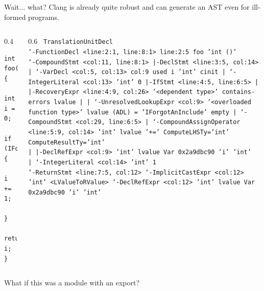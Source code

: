 \documentclass[aspectratio=169]{beamer}
\begin{document}
\begin{frame}[fragile]{Wait... what?}
  Clang is already quite robust and can generate an AST even for ill-formed programs.
  \vspace{1em}
  \begin{columns}
    \begin{column}{0.4\textwidth}
      \begin{verbatim}
int foo() {
    int i = 0;
    if (IForgotAnInclude()) {
        i += 1;
    }
    return i;
}
    \end{verbatim}
    \end{column}
    \begin{column}{0.6\textwidth}
      \tiny\texttt{
      TranslationUnitDecl \\
      `-FunctionDecl <line:2:1, line:8:1> line:2:5 foo 'int ()' \\
      `-CompoundStmt <col:11, line:8:1> \\
      |-DeclStmt <line:3:5, col:14> \\
      | `-VarDecl <col:5, col:13> col:9 used i 'int' cinit \\
      |   `-IntegerLiteral <col:13> 'int' 0 \\
      |-IfStmt <line:4:5, line:6:5> \\
      | |-{\color{red}RecoveryExpr <line:4:9, col:26> '<dependent type>' contains-errors} lvalue \\
      | | `-{\color{purple}UnresolvedLookupExpr <col:9> '<overloaded function type>' lvalue (ADL) = 'IForgotAnInclude' empty} \\
      | `-CompoundStmt <col:29, line:6:5> \\
      |   `-CompoundAssignOperator <line:5:9, col:14> 'int' lvalue '+=' ComputeLHSTy='int' ComputeResultTy='int' \\
      |     |-DeclRefExpr <col:9> 'int' lvalue Var 0x2a9dbc90 'i' 'int' \\
      |     `-IntegerLiteral <col:14> 'int' 1 \\
      `-ReturnStmt <line:7:5, col:12> \\
      `-ImplicitCastExpr <col:12> 'int' <LValueToRValue> \\
      `-DeclRefExpr <col:12> 'int' lvalue Var 0x2a9dbc90 'i' 'int'
      }
    \end{column}
  \end{columns}
  \vspace{0.5em}
  \begin{center}
    \small What if this was a module with an export?
  \end{center}
\end{frame}
\end{document}
